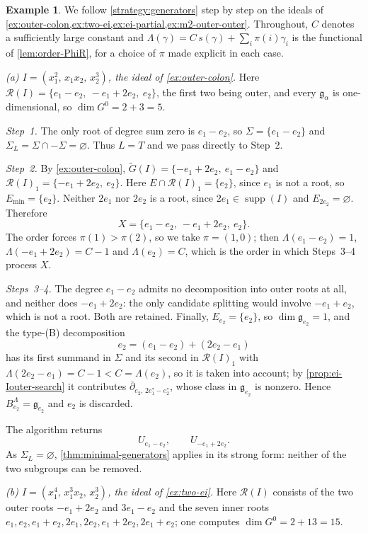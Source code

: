 \documentclass[11pt,letterpaper,reqno]{amsart}
\theoremstyle{remark}
\theoremstyle{definition}
\newtheorem{example}[example]{Example}
\newcommand{\supp}[0]{\ensuremath{\operatorname{supp}}}
\newcommand{\R}{\mathcal R}
\begin{document}
\begin{example}\label{ex:strategy-run}
We follow \cref{strategy:generators} step by step on the ideals of
\cref{ex:outer-colon,ex:two-ei,ex:ei-partial,ex:m2-outer-outer}. Throughout, $C$
denotes a sufficiently large constant and
$\Lambda(\gamma)=C\,s(\gamma)+\sum_{i}\pi(i)\gamma_i$ is the functional of
\cref{lem:order-PhiR}, for a choice of $\pi$ made explicit in each case.

\medskip\noindent\emph{(a) $I=(x_1^2,\,x_1x_2,\,x_2^3)$, the ideal of \cref{ex:outer-colon}.}
Here $\R(I)=\{e_1-e_2,\ -e_1+2e_2,\ e_2\}$, the first two being outer, and every
$\mathfrak g_\alpha$ is one-dimensional, so $\dim G^0=2+3=5$.

\emph{Step~1.} The only root of degree sum zero is $e_1-e_2$, so $\Sigma=\{e_1-e_2\}$ and
$\Sigma_L=\Sigma\cap-\Sigma=\varnothing$. Thus $L=T$ and we pass directly to Step~2.

\emph{Step~2.} By \cref{ex:outer-colon}, $\widetilde G(I)=\{-e_1+2e_2,\ e_1-e_2\}$ and
$\R(I)_1=\{-e_1+2e_2,\ e_2\}$. Here $E\cap\R(I)_1=\{e_2\}$, since $e_1$ is not a root, so
$E_{\mathrm{min}}=\{e_2\}$. Neither $2e_1$ nor $2e_2$ is a root, since $2e_1\in\supp(I)$ and
$E_{2e_2}=\varnothing$. Therefore
$$X=\{e_1-e_2,\ -e_1+2e_2,\ e_2\}.$$
The order forces $\pi(1)>\pi(2)$, so we take $\pi=(1,0)$; then
$\Lambda(e_1-e_2)=1$, $\Lambda(-e_1+2e_2)=C-1$ and $\Lambda(e_2)=C$, which is the order in
which Steps~3--4 process $X$.

\emph{Steps~3--4.} The degree $e_1-e_2$ admits no decomposition into outer roots at all, and
neither does $-e_1+2e_2$: the only candidate splitting would involve $-e_1+e_2$, which is not
a root. Both are retained. Finally, $E_{e_2}=\{e_2\}$, so $\dim\mathfrak g_{e_2}=1$, and the
type-\textup{(B)} decomposition
$$e_2=(e_1-e_2)+(2e_2-e_1)$$
has its first summand in $\Sigma$ and its second in $\R(I)_1$ with
$\Lambda(2e_2-e_1)=C-1<C=\Lambda(e_2)$, so it is taken into account; by
\cref{prop:ei-Iouter-search} it contributes $\overline\partial_{e_2,\,2e_1^*-e_2^*}$, whose
class in $\mathfrak g_{e_2}$ is nonzero. Hence $B^\Lambda_{e_2}=\mathfrak g_{e_2}$ and $e_2$
is discarded.

The algorithm returns
$$U_{e_1-e_2},\qquad U_{-e_1+2e_2}.$$
As $\Sigma_L=\varnothing$, \cref{thm:minimal-generators} applies in its strong form: neither
of the two subgroups can be removed.

\medskip\noindent\emph{(b) $I=(x_1^4,\,x_1^3x_2,\,x_2^3)$, the ideal of \cref{ex:two-ei}.}
Here $\R(I)$ consists of the two outer roots $-e_1+2e_2$ and $3e_1-e_2$ and the seven inner
roots $e_1,e_2,e_1+e_2,2e_1,2e_2,e_1+2e_2,2e_1+e_2$; one computes $\dim G^0=2+13=15$.


\end{example}
\end{document}
